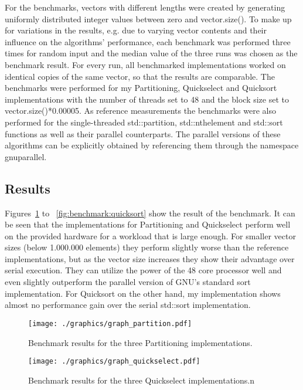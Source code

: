 \documentclass[sigconf]{acmart}
\begin{document}
For the benchmarks, vectors with different lengths were created by generating uniformly distributed integer values between zero and vector.size(). To make up for variations in the results, e.g. due to varying vector contents and their influence on the algorithms' performance, each benchmark was performed three times for random input and the median value of the three runs was chosen as the benchmark result. For every run, all benchmarked implementations worked on identical copies of the same vector, so that the results are comparable. The benchmarks were performed for my Partitioning, Quickselect and Quicksort implementations with the number of threads set to 48 and the block size set to vector.size()*0.00005. As reference measurements the benchmarks were also performed for the single-threaded std::partition, std::nth\textunderscore element and std::sort functions as well as their parallel counterparts. The parallel versions of these algorithms can be explicitly obtained by referencing them through the namespace \textunderscore \textunderscore gnu\textunderscore parallel.

\subsection{Results}
\label{sub:sec:results}

Figures~\ref{fig:benchmark:partition} to ~\ref{fig:benchmark:quicksort} show the result of the benchmark.
It can be seen that the implementations for Partitioning and Quickselect perform well on the provided hardware for a workload that is large enough. For smaller vector sizes (below 1.000.000 elements) they perform slightly worse than the reference implementations, but as the vector size increases they show their advantage over serial execution. They can utilize the power of the 48 core processor well and even slightly outperform the parallel version of GNU's standard sort implementation. For Quicksort on the other hand, my implementation shows almost no performance gain over the serial std::sort implementation. 

\begin{figure}[h]
  \centering
  \texttt{[image: ./graphics/graph\_partition.pdf]}
  \caption{Benchmark results for the three Partitioning implementations.} 
  \label{fig:benchmark:partition}
\end{figure}

\begin{figure}[h]
  \centering
  \texttt{[image: ./graphics/graph\_quickselect.pdf]}
  \caption{Benchmark results for the three Quickselect implementations.n} 
  \label{fig:benchmark:quickselect}
\end{figure}
\end{document}
